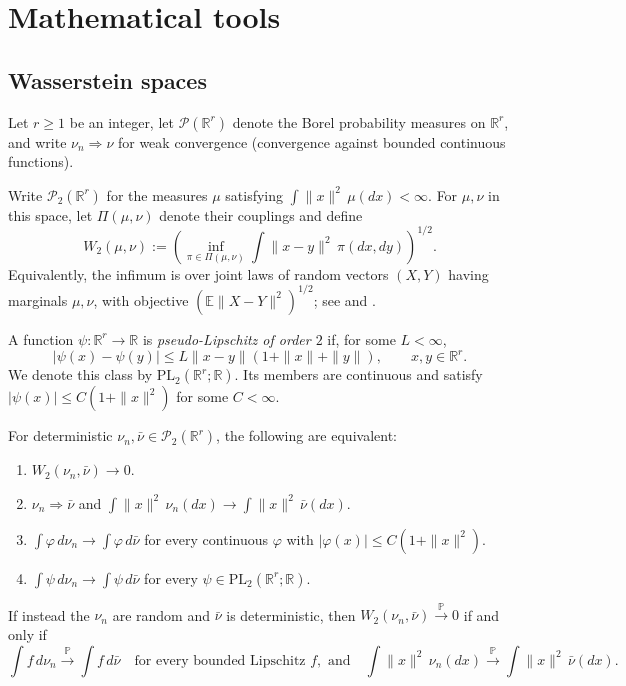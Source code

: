 \section{Mathematical tools}
\label{sec:math-prelim}

\subsection{Wasserstein spaces}
\label{subsec:wasserstein}

Let $r\ge1$ be an integer, let $\mathscr P(\mathbb R^r)$ denote the Borel
probability measures on $\mathbb R^r$, and write $\nu_n\Rightarrow\nu$
for weak convergence (convergence against bounded continuous functions).

\begin{definition}
\label{definition:wasserstein-distance}
Write $\mathscr P_2(\mathbb R^r)$ for the measures $\mu$ satisfying
$\int\|x\|^2\,\mu(dx)<\infty$. For $\mu,\nu$ in this space, let
$\Pi(\mu,\nu)$ denote their couplings and define
\[
  W_2(\mu,\nu)
  :=\left(\inf_{\pi\in\Pi(\mu,\nu)}
     \int\|x-y\|^2\,\pi(dx,dy)\right)^{1/2}.
\]
Equivalently, the infimum is over joint laws of random vectors
$(X,Y)$ having marginals $\mu,\nu$, with objective
$(\mathbb E\|X-Y\|^2)^{1/2}$; see
\cite[Chapter~6]{villani2009optimal} and
\cite[Section~7.1]{ambrosio2008gradientflows}.
\end{definition}

\begin{definition}
\label{definition:pseudo-lipschitz}
A function $\psi:\mathbb R^r\to\mathbb R$ is
\emph{pseudo-Lipschitz of order $2$} if, for some $L<\infty$,
\[
  |\psi(x)-\psi(y)|
  \le L\|x-y\|(1+\|x\|+\|y\|),\qquad x,y\in\mathbb R^r.
\]
We denote this class by $\mathrm{PL}_2(\mathbb R^r;\mathbb R)$.
Its members are continuous and satisfy
$|\psi(x)|\le C(1+\|x\|^2)$ for some $C<\infty$.
\end{definition}

\begin{proposition}
\label{proposition:wasserstein-convergence-characterization}
For deterministic $\nu_n,\bar\nu\in\mathscr P_2(\mathbb R^r)$,
the following are equivalent:
\begin{enumerate}
  \item $W_2(\nu_n,\bar\nu)\to0$.
  \item $\nu_n\Rightarrow\bar\nu$ and
  $\int\|x\|^2\,\nu_n(dx)\to\int\|x\|^2\,\bar\nu(dx)$.
  \item $\int\varphi\,d\nu_n\to\int\varphi\,d\bar\nu$ for every
  continuous $\varphi$ with $|\varphi(x)|\le C(1+\|x\|^2)$.
  \item $\int\psi\,d\nu_n\to\int\psi\,d\bar\nu$ for every
  $\psi\in\mathrm{PL}_2(\mathbb R^r;\mathbb R)$.
\end{enumerate}
If instead the $\nu_n$ are random and $\bar\nu$ is deterministic,
then $W_2(\nu_n,\bar\nu)\xrightarrow{\mathbb P}0$ if and only if
\[
  \int f\,d\nu_n\xrightarrow{\mathbb P}\int f\,d\bar\nu
  \quad
  \text{for every bounded Lipschitz }f, \text{ and}
  \quad
  \int\|x\|^2\,\nu_n(dx)
  \xrightarrow{\mathbb P}\int\|x\|^2\,\bar\nu(dx).
\]
\end{proposition}

